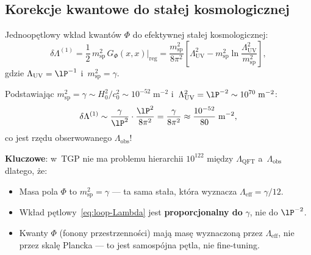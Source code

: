 \subsection{Korekcje kwantowe do stałej kosmologicznej}%
\label{app:E-cosmconst}

\begin{proposition}%
\label{prop:loop-Lambda}
Jednoopętlowy wkład kwantów $\Phi$ do efektywnej stałej
kosmologicznej:
\begin{equation}\label{eq:loop-Lambda}
    \delta\Lambda^{(1)}
    = \frac{1}{2}\,m_{\mathrm{sp}}^2\,
      G_\Phi(x,x)\big|_{\mathrm{reg}}
    = \frac{m_{\mathrm{sp}}^2}{8\pi^2}
      \left[\Lambda_{\mathrm{UV}}^2 - m_{\mathrm{sp}}^2
      \ln\frac{\Lambda_{\mathrm{UV}}^2}{m_{\mathrm{sp}}^2}\right],
\end{equation}
gdzie $\Lambda_{\mathrm{UV}} = \lP^{-1}$ i~$m_{\mathrm{sp}}^2 = \gamma$.
\end{proposition}

\begin{remark}%
\label{rem:naturalness}
Podstawiając $m_{\mathrm{sp}}^2 = \gamma \sim H_0^2/c_0^2
\sim 10^{-52}\;\mathrm{m}^{-2}$
i~$\Lambda_{\mathrm{UV}}^2 = \lP^{-2} \sim 10^{70}\;\mathrm{m}^{-2}$:
\begin{equation}
    \delta\Lambda^{(1)}
    \sim \frac{\gamma}{\lP^2} \cdot \frac{\lP^2}{8\pi^2}
    = \frac{\gamma}{8\pi^2}
    \approx \frac{10^{-52}}{80} \;\mathrm{m}^{-2},
\end{equation}
co jest rzędu obserwowanego $\Lambda_{\mathrm{obs}}$!

\textbf{Kluczowe}: w~TGP nie ma problemu hierarchii
$10^{122}$ między $\Lambda_{\mathrm{QFT}}$ a~$\Lambda_{\mathrm{obs}}$
dlatego, że:
\begin{itemize}[nosep]
    \item Masa pola $\Phi$ to $m_{\mathrm{sp}}^2 = \gamma$ ---
          ta sama stała, która wyznacza $\Lambda_{\mathrm{eff}} = \gamma/12$.
    \item Wkład pętlowy~\eqref{eq:loop-Lambda} jest
          \textbf{proporcjonalny do} $\gamma$, nie do $\lP^{-2}$.
    \item Kwanty $\Phi$ (fonony przestrzenności) mają masę
          wyznaczoną przez $\Lambda_{\mathrm{eff}}$, nie przez skalę
          Plancka --- to jest samospójna pętla, nie fine-tuning.
\end{itemize}
\end{remark}

